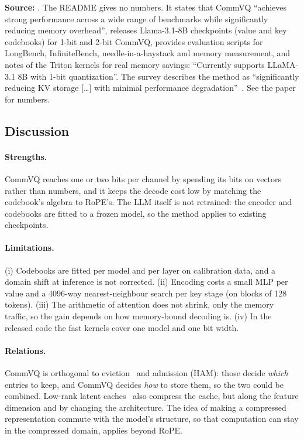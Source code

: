 \begin{results}
\textbf{Source:} . The README gives no numbers.
It states that CommVQ ``achieves strong performance across a wide range of benchmarks while
significantly reducing memory overhead'', releases Llama-3.1-8B checkpoints (value and key codebooks)
for 1-bit and 2-bit CommVQ, provides evaluation scripts for LongBench, InfiniteBench, needle-in-a-haystack
and memory measurement, and notes of the Triton kernels for real memory savings: ``Currently
supports LLaMA-3.1 8B with 1-bit quantization''. The survey describes the method as ``significantly
reducing KV storage [\dots] with minimal performance degradation''~\citep{zhoubian2026memory}. See the paper
for numbers.
\end{results}

\subsection{Discussion}

\paragraph{Strengths.} CommVQ reaches one or two bits per channel by spending its bits on vectors
rather than numbers, and it keeps the decode cost low by matching the codebook's algebra to RoPE's. The
LLM itself is not retrained: the encoder and codebooks are fitted to a frozen model, so the method
applies to existing checkpoints.

\paragraph{Limitations.} (i) Codebooks are fitted per model and per layer on calibration data, and a
domain shift at inference is not corrected. (ii) Encoding costs a small MLP per value and a 4096-way
nearest-neighbour search per key stage (on blocks of 128 tokens). (iii) The arithmetic of attention does
not shrink, only the memory traffic, so the gain depends on how memory-bound decoding is. (iv) In the
released code the fast kernels cover one model and one bit width.

\paragraph{Relations.} CommVQ is orthogonal to eviction~\citep{c13-zhang2023h2o} and admission (HAM):
those decide \emph{which} entries to keep, and CommVQ decides \emph{how} to store them, so the two could
be combined. Low-rank latent caches~\citep{deepseek2024v2} also compress the cache, but along the
feature dimension and by changing the architecture. The idea of making a compressed representation
commute with the model's structure, so that computation can stay in the compressed domain, applies
beyond RoPE.

